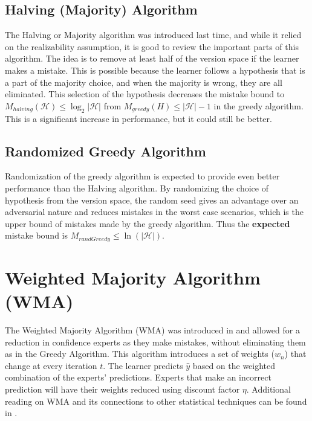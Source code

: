 \documentclass[11pt]{article}
\begin{document}
\subsection {Halving (Majority) Algorithm}
The Halving or Majority algorithm was introduced last time, and while it relied on the realizability assumption, it is good to review the important parts of this algorithm. The idea is to remove at least half of the version space if the learner makes a mistake. This is possible because the learner follows a hypothesis that is a part of the majority choice, and when the majority is wrong, they are all eliminated. This selection of the hypothesis decreases the mistake bound to $M_{halving}(\mathcal{H})\leq\log_2|\mathcal{H}|$ from $M_{greedy}(H)\leq|\mathcal{H}|-1$ in the greedy algorithm. This is a significant increase in performance, but it could still be better. 

\subsection {Randomized Greedy Algorithm}
Randomization of the greedy algorithm is expected to provide even better performance than the Halving algorithm. By randomizing the choice of hypothesis from the version space, the random seed gives an advantage over an adversarial nature and reduces mistakes in the worst case scenarios, which is the upper bound of mistakes made by the greedy algorithm. Thus the \textbf{expected} mistake bound is $M_{randGreedy}\leq\ln(|\mathcal{H}|)$.

\section{Weighted Majority Algorithm (WMA)}
The Weighted Majority Algorithm (WMA) was introduced in \cite{littlestone1989weighted} and allowed for a reduction in confidence experts as they make mistakes, without eliminating them as in the Greedy Algorithm. This algorithm introduces a set of weights ($w_n$) that change at every iteration $t$. The learner predicts $\hat{y}$ based on the weighted combination of the experts' predictions. Experts that make an incorrect prediction will have their weights reduced using discount factor $\eta$. Additional reading on WMA and its connections to other statistical techniques can be found in \cite{arora2012multiplicative}.
\end{document}
